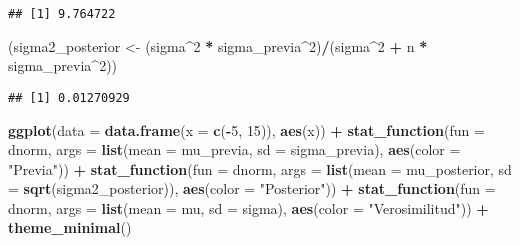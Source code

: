\documentclass[
  12pt,
]{book}
\newenvironment{Shaded}{\begin{snugshade}}{\end{snugshade}}
\newcommand{\DataTypeTok}[1]{\textcolor[rgb]{0.13,0.29,0.53}{#1}}
\newcommand{\DecValTok}[1]{\textcolor[rgb]{0.00,0.00,0.81}{#1}}
\newcommand{\KeywordTok}[1]{\textcolor[rgb]{0.13,0.29,0.53}{\textbf{#1}}}
\newcommand{\NormalTok}[1]{#1}
\newcommand{\OperatorTok}[1]{\textcolor[rgb]{0.81,0.36,0.00}{\textbf{#1}}}
\newcommand{\StringTok}[1]{\textcolor[rgb]{0.31,0.60,0.02}{#1}}
\begin{document}
\begin{verbatim}
## [1] 9.764722
\end{verbatim}

\begin{Shaded}
\begin{Highlighting}[]
\NormalTok{(sigma2\_posterior \textless{}{-}}\StringTok{ }\NormalTok{(sigma}\OperatorTok{\^{}}\DecValTok{2} \OperatorTok{*}\StringTok{ }\NormalTok{sigma\_previa}\OperatorTok{\^{}}\DecValTok{2}\NormalTok{)}\OperatorTok{/}\NormalTok{(sigma}\OperatorTok{\^{}}\DecValTok{2} \OperatorTok{+}\StringTok{ }
\StringTok{    }\NormalTok{n }\OperatorTok{*}\StringTok{ }\NormalTok{sigma\_previa}\OperatorTok{\^{}}\DecValTok{2}\NormalTok{))}
\end{Highlighting}
\end{Shaded}

\begin{verbatim}
## [1] 0.01270929
\end{verbatim}

\begin{Shaded}
\begin{Highlighting}[]
\KeywordTok{ggplot}\NormalTok{(}\DataTypeTok{data =} \KeywordTok{data.frame}\NormalTok{(}\DataTypeTok{x =} \KeywordTok{c}\NormalTok{(}\OperatorTok{{-}}\DecValTok{5}\NormalTok{, }\DecValTok{15}\NormalTok{)), }\KeywordTok{aes}\NormalTok{(x)) }\OperatorTok{+}\StringTok{ }
\StringTok{    }\KeywordTok{stat\_function}\NormalTok{(}\DataTypeTok{fun =}\NormalTok{ dnorm, }\DataTypeTok{args =} \KeywordTok{list}\NormalTok{(}\DataTypeTok{mean =}\NormalTok{ mu\_previa, }
        \DataTypeTok{sd =}\NormalTok{ sigma\_previa), }\KeywordTok{aes}\NormalTok{(}\DataTypeTok{color =} \StringTok{"Previa"}\NormalTok{)) }\OperatorTok{+}\StringTok{ }
\StringTok{    }\KeywordTok{stat\_function}\NormalTok{(}\DataTypeTok{fun =}\NormalTok{ dnorm, }\DataTypeTok{args =} \KeywordTok{list}\NormalTok{(}\DataTypeTok{mean =}\NormalTok{ mu\_posterior, }
        \DataTypeTok{sd =} \KeywordTok{sqrt}\NormalTok{(sigma2\_posterior)), }\KeywordTok{aes}\NormalTok{(}\DataTypeTok{color =} \StringTok{"Posterior"}\NormalTok{)) }\OperatorTok{+}\StringTok{ }
\StringTok{    }\KeywordTok{stat\_function}\NormalTok{(}\DataTypeTok{fun =}\NormalTok{ dnorm, }\DataTypeTok{args =} \KeywordTok{list}\NormalTok{(}\DataTypeTok{mean =}\NormalTok{ mu, }
        \DataTypeTok{sd =}\NormalTok{ sigma), }\KeywordTok{aes}\NormalTok{(}\DataTypeTok{color =} \StringTok{"Verosimilitud"}\NormalTok{)) }\OperatorTok{+}\StringTok{ }
\StringTok{    }\KeywordTok{theme\_minimal}\NormalTok{()}
\end{Highlighting}
\end{Shaded}
\end{document}
